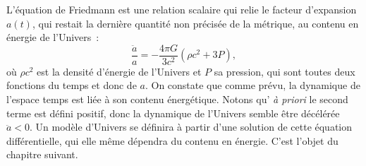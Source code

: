L'équation de Friedmann est une relation scalaire qui relie le facteur d'expansion $a(t)$, qui restait la dernière quantité non précisée de la métrique, au contenu en énergie de l'Univers~:
\begin{equation}
\frac{\ddot a}{a}=-\frac{4\pi G}{3c^2}(\rho c^2 +3 P),
\label{e:friedmann}
\end{equation}
où $\rho c^2$ est la densité d'énergie de l'Univers et $P$ sa pression, qui sont toutes deux fonctions du temps et donc de $a$. On constate que comme prévu, la dynamique de l'espace temps est liée à son contenu énergétique. Notons qu’ \textit{à priori} le second terme est défini positif, donc la dynamique de l'Univers semble être décélérée $\ddot a<0$. Un modèle d'Univers se définira à partir d'une solution de cette équation différentielle, qui elle même dépendra du contenu en énergie. C'est l'objet du chapitre suivant.